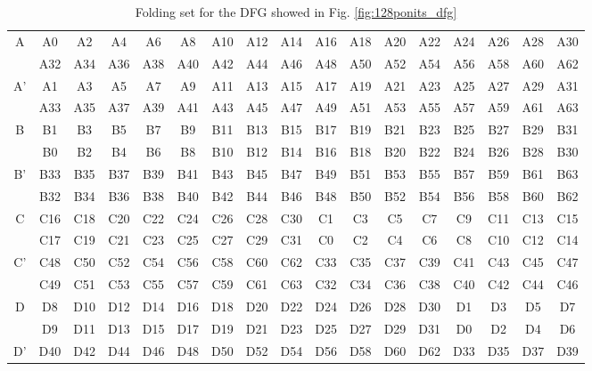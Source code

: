 \documentclass[journal,comsoc]{IEEEtran}
\begin{document}
\begin{small}
\begin{table} 
	\centering
	\begin{threeparttable}
		\centering
		\caption{Folding set for the DFG showed in Fig. \ref{fig:128ponits_dfg}} 
		\begin{tabular}{|c||cccccccccccccccc|}
			\hline
			\multirow{2}{*}{A} & A0 & A2 & A4 & A6 & A8 & A10 & A12 & A14 & A16 & A18 & A20 & A22 & A24 & A26 & A28 & A30 \\  
			& A32 & A34 & A36 & A38 & A40 & A42 & A44 & A46 & A48 & A50 & A52 & A54 & A56 & A58 & A60 & A62 \\  
			\hline
			\multirow{2}{*}{A'} & A1 & A3 & A5 & A7 & A9 & A11 & A13 & A15 & A17 & A19 & A21 & A23 & A25 & A27 & A29 & A31 \\  
			& A33 & A35 & A37 & A39 & A41 & A43 & A45 & A47 & A49 & A51 & A53 & A55 & A57 & A59 & A61 & A63 \\  
			\hline
			\multirow{2}{*}{B} & B1 & B3 & B5 & B7 & B9 & B11 & B13 & B15 & B17 & B19 & B21 & B23 & B25 & B27 & B29 & B31 \\  
			& B0 & B2 & B4 & B6 & B8 & B10 & B12 & B14 & B16 & B18 & B20 & B22 & B24 & B26 & B28 & B30 \\  
			\hline
			\multirow{2}{*}{B'} & B33 & B35 & B37 & B39 & B41 & B43 & B45 & B47 & B49 & B51 & B53 & B55 & B57 & B59 & B61 & B63 \\  
			& B32 & B34 & B36 & B38 & B40 & B42 & B44 & B46 & B48 & B50 & B52 & B54 & B56 & B58 & B60 & B62 \\  
			\hline
			\multirow{2}{*}{C} & C16 & C18 & C20 & C22 & C24 & C26 & C28 & C30 & C1 & C3 & C5 & C7 & C9 & C11 & C13 & C15 \\  
			& C17 & C19 & C21 & C23 & C25 & C27 & C29 & C31 & C0 & C2 & C4 & C6 & C8 & C10 & C12 & C14 \\  
			\hline
			\multirow{2}{*}{C'} & C48 & C50 & C52 & C54 & C56 & C58 & C60 & C62 & C33 & C35 & C37 & C39 & C41 & C43 & C45 & C47 \\  
			& C49 & C51 & C53 & C55 & C57 & C59 & C61 & C63 & C32 & C34 & C36 & C38 & C40 & C42 & C44 & C46 \\  
			\hline
			\multirow{2}{*}{D} & D8 & D10 & D12 & D14 & D16 & D18 & D20 & D22 & D24 & D26 & D28 & D30 & D1 & D3 & D5 & D7 \\  
			& D9 & D11 & D13 & D15 & D17 & D19 & D21 & D23 & D25 & D27 & D29 & D31 & D0 & D2 & D4 & D6 \\  
			\hline
			\multirow{2}{*}{D'} & D40 & D42 & D44 & D46 & D48 & D50 & D52 & D54 & D56 & D58 & D60 & D62 & D33 & D35 & D37 & D39 \\  

\end{tabular}
\end{threeparttable}
\end{table}
\end{small}
\end{document}

